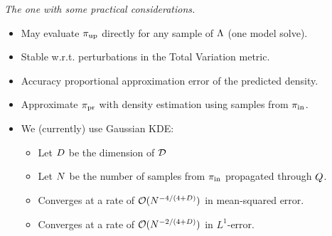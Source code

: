 \begin{frame}[t]{\it The one with some practical considerations.}

\begin{itemize}

  \item May evaluate $\operatorname*{\pi_{up}}$ directly for any sample of ${\Lambda}$ (one model solve).

  \bigskip
  \item Stable w.r.t. perturbations in the Total Variation metric.

  \bigskip
  \item Accuracy proportional approximation error of the predicted density.

  \bigskip
  \item Approximate $\operatorname*{\pi_{pr}}$ with density estimation using samples from $\operatorname*{\pi_{in}}$.


  \bigskip
  \item We (currently) use Gaussian KDE:
	\begin{itemize}
			\item Let $D$ be the dimension of $\mathcal{D}$
			\item Let $N$ be the number of samples from $\operatorname*{\pi_{in}}$ propagated through $Q$.
			\item Converges at a rate of $\mathcal{O}(N^{-4/(4+D)})$ in mean-squared error.
			\item Converges at a rate of $\mathcal{O}(N^{-2/(4+D)})$ in $L^1$-error.
	\end{itemize}

\end{itemize}

\end{frame}
